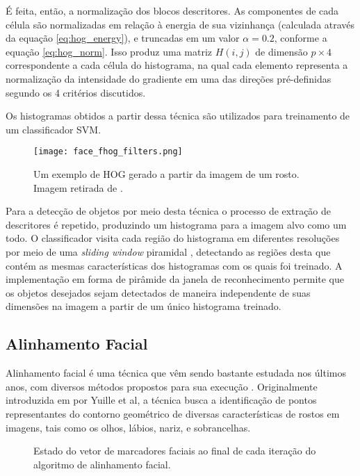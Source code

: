 É feita, então, a normalização dos blocos descritores.
As componentes de cada célula são normalizadas em relação à energia de sua vizinhança (calculada através da equação \ref{eq:hog_energy}), e truncadas em um valor $\alpha=0.2$, conforme a equação \ref{eq:hog_norm}.
Isso produz uma matriz $H(i,j)$ de dimensão $p\times4$ correspondente a cada célula do histograma, na qual cada elemento representa a normalização da intensidade do gradiente em uma das direções pré-definidas segundo os 4 critérios discutidos.

Os histogramas obtidos a partir dessa técnica são utilizados para treinamento de um classificador SVM.

\begin{figure}[ht]
    \centering
    \texttt{[image: face\_fhog\_filters.png]}
    \caption{Um exemplo de HOG gerado a partir da imagem de um rosto. Imagem retirada de \cite{kingDlib18Released}.}
    \label{fig:dlib_hog}
\end{figure}

Para a detecção de objetos por meio desta técnica o processo de extração de descritores é repetido, produzindo um histograma para a imagem alvo como um todo.
O classificador visita cada região do histograma em diferentes resoluções por meio de uma \textit{sliding window} piramidal \cite{dalalHistogramsOrientedGradients2005}, detectando as regiões desta que contém as mesmas características dos histogramas com os quais foi treinado.
A implementação em forma de pirâmide da janela de reconhecimento permite que os objetos desejados sejam detectados de maneira independente de suas dimensões na imagem a partir de um único histograma treinado.

\subsection{Alinhamento Facial}
\label{sec:faciallm}

Alinhamento facial é uma técnica que vêm sendo bastante estudada nos últimos anos, com diversos métodos propostos para sua execução \cite{caoFaceAlignmentExplicit2014, liangFaceAlignmentComponentBased2008, dantoneRealtimeFacialFeature2012, xiangxinzhuFaceDetectionPose2012}.
Originalmente introduzida em \cite{yuilleFeatureExtractionFaces1992} por Yuille et al, a técnica busca a identificação de pontos representantes do contorno geométrico de diversas características de rostos em imagens, tais como os olhos, lábios, nariz, e sobrancelhas.

\begin{figure}[ht]
    \centering
    
    \caption{Estado do vetor de marcadores faciais ao final de cada iteração do algoritmo de alinhamento facial.}
    \label{fig:faciallm_iters}
\end{figure}

